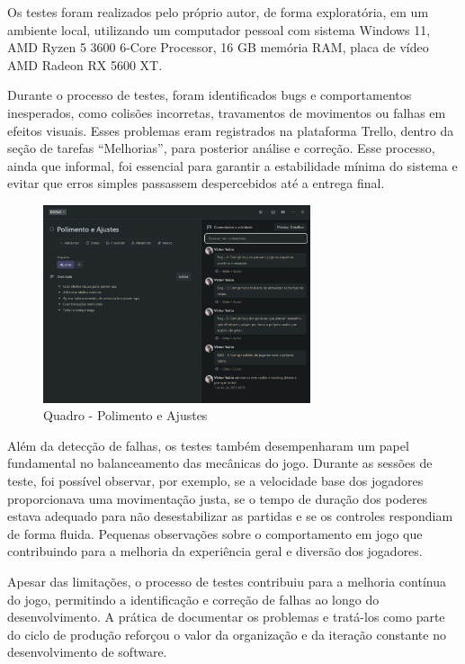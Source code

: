 Os testes foram realizados pelo próprio autor, de forma exploratória, em um ambiente local, utilizando um computador pessoal com sistema Windows 11, AMD Ryzen 5 3600 6-Core Processor, 16 GB memória RAM, placa de vídeo AMD Radeon RX 5600 XT.

Durante o processo de testes, foram identificados bugs e comportamentos inesperados, como colisões incorretas, travamentos de movimentos ou falhas em efeitos visuais. Esses problemas eram registrados na plataforma Trello, dentro da seção de tarefas “Melhorias”, para posterior análise e correção. Esse processo, ainda que informal, foi essencial para garantir a estabilidade mínima do sistema e evitar que erros simples passassem despercebidos até a entrega final.

\begin{figure}[htbp]
    \centering
    \caption{Quadro - Polimento e Ajustes}
    \label{fig:polimento-e-ajustes}
    \includegraphics[width=0.7\textwidth]{figuras/bugs-tcc.png}
\end{figure}

Além da detecção de falhas, os testes também desempenharam um papel fundamental no balanceamento das mecânicas do jogo. Durante as sessões de teste, foi possível observar, por exemplo, se a velocidade base dos jogadores proporcionava uma movimentação justa, se o tempo de duração dos poderes estava adequado para não desestabilizar as partidas e se os controles respondiam de forma fluida. Pequenas observações sobre o  comportamento em jogo que contribuindo para a melhoria da experiência geral e diversão dos jogadores.

Apesar das limitações, o processo de testes contribuiu para a melhoria contínua do jogo, permitindo a identificação e correção de falhas ao longo do desenvolvimento. A prática de documentar os problemas e tratá-los como parte do ciclo de produção reforçou o valor da organização e da iteração constante no desenvolvimento de software.

